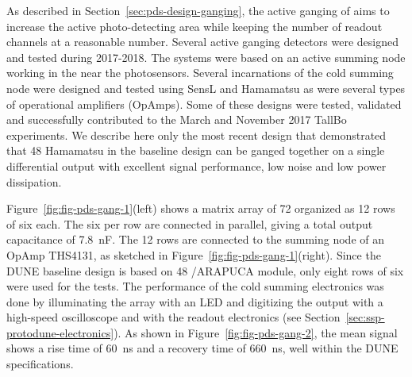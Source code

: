 As described in Section~\ref{sec:pds-design-ganging}, the active ganging of   aims to increase the active photo-detecting area while keeping the number of readout channels at a reasonable number. 
Several active ganging detectors were designed and tested during 2017-2018. 
The systems were based on an active summing node working in the \lar near the photosensors. Several incarnations of the cold summing node were designed and tested using SensL and Hamamatsu  %
as were several types of operational amplifiers (OpAmps). 
Some of these designs were tested, validated and successfully contributed to the March and November 2017 TallBo experiments.  
We describe here only the most recent design that demonstrated that 48 Hamamatsu  in the baseline design can be ganged together on a single differential output with excellent signal performance, low noise and low power dissipation.

Figure~\ref{fig:fig-pds-gang-1}(left) shows a matrix array of 72  organized as 12 rows of six  each. 
The six  per row are connected in parallel, giving a total output capacitance of \SI{7.8}{nF}. The 12 rows are connected to the summing node of an OpAmp THS4131, as sketched in Figure~\ref{fig:fig-pds-gang-1}(right). 
Since the DUNE baseline design is based on 48 /ARAPUCA module, only eight rows of six were used for the tests. 
The performance of the cold summing electronics was done by illuminating the  array with an LED and digitizing the output with a high-speed oscilloscope and with the  readout electronics (see Section~\ref{sec:ssp-protodune-electronics}).
As shown in Figure~\ref{fig:fig-pds-gang-2}, the mean signal shows a rise time of \SI{60}{ns} and a recovery time of \SI{660}{ns}, well within the DUNE  specifications. %

